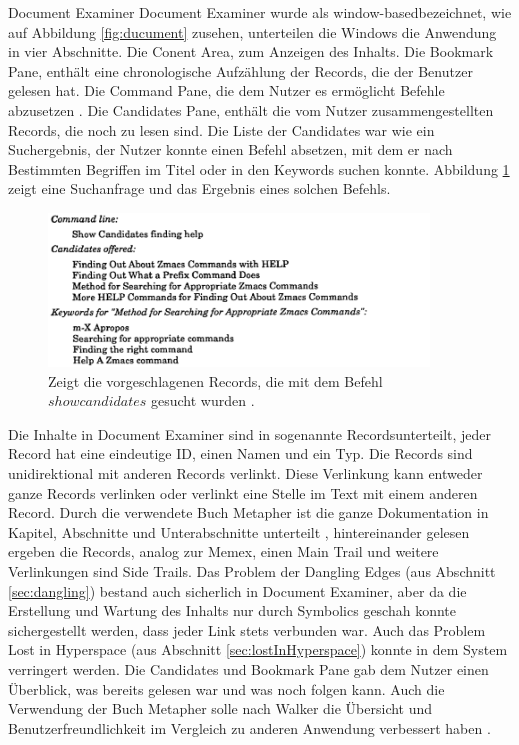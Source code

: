 \begin{section}{Document Examiner}
Document Examiner wurde als \glqq window-based\grqq{ }bezeichnet, wie auf Abbildung \ref{fig:ducument} zusehen, unterteilen die Windows die Anwendung in vier Abschnitte. Die Conent Area, zum Anzeigen des Inhalts. Die Bookmark Pane, enthält eine chronologische Aufzählung der Records, die der Benutzer gelesen hat. Die Command Pane, die dem Nutzer es ermöglicht Befehle abzusetzen \cite{Walker1987}. Die Candidates Pane, enthält die vom Nutzer zusammengestellten Records, die noch zu lesen sind. Die Liste der Candidates war wie ein Suchergebnis, der Nutzer konnte einen Befehl absetzen, mit dem er nach Bestimmten Begriffen im Titel oder in den Keywords suchen konnte. Abbildung \ref{fig:candidates} zeigt eine Suchanfrage und das Ergebnis eines solchen Befehls.

\begin{figure}[H]
	\centering
	\includegraphics[width=0.9\textwidth]{image/candidates}
	\caption{Zeigt die vorgeschlagenen Records, die mit dem Befehl $show candidates$ gesucht wurden \cite{Walker1987}.}
	\label{fig:candidates}
\end{figure}

Die Inhalte in Document Examiner sind in sogenannte \glqq Records\grqq{ }unterteilt, jeder Record hat eine eindeutige ID, einen Namen und ein Typ. Die Records sind unidirektional mit anderen Records verlinkt. Diese Verlinkung kann entweder ganze Records verlinken oder verlinkt eine Stelle im Text mit einem anderen Record. Durch die verwendete Buch Metapher ist die ganze Dokumentation in Kapitel, Abschnitte und Unterabschnitte unterteilt \cite{Walker1987}, hintereinander gelesen ergeben die Records, analog zur Memex, einen Main Trail und weitere Verlinkungen sind Side Trails. Das Problem der Dangling Edges (aus Abschnitt \ref{sec:dangling}) bestand auch sicherlich in Document Examiner, aber da die Erstellung und Wartung des Inhalts nur durch Symbolics geschah \cite{Walker1987} konnte sichergestellt werden, dass jeder Link stets verbunden war. Auch das Problem Lost in Hyperspace (aus Abschnitt \ref{sec:lostInHyperspace}) konnte in dem System verringert werden. Die Candidates und Bookmark Pane gab dem Nutzer einen Überblick, was bereits gelesen war und was noch folgen kann. Auch die Verwendung der Buch Metapher solle nach Walker die Übersicht und Benutzerfreundlichkeit im Vergleich zu anderen Anwendung verbessert haben \cite{Walker1987}.

\end{section}

